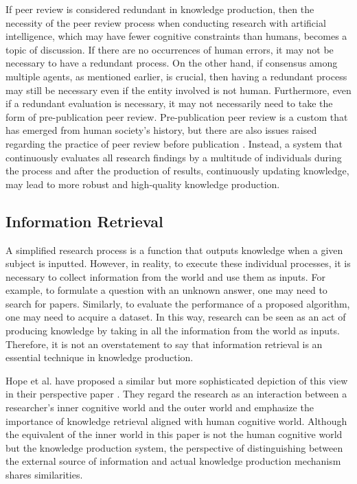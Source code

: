 \documentclass{book}
\begin{document}
If peer review is considered redundant in knowledge production, then the necessity of the peer review process when conducting research with artificial intelligence, which may have fewer cognitive constraints than humans, becomes a topic of discussion. If there are no occurrences of human errors, it may not be necessary to have a redundant process. On the other hand, if consensus among multiple agents, as mentioned earlier, is crucial, then having a redundant process may still be necessary even if the entity involved is not human. Furthermore, even if a redundant evaluation is necessary, it may not necessarily need to take the form of pre-publication peer review. Pre-publication peer review is a custom that has emerged from human society's history, but there are also issues raised regarding the practice of peer review before publication \cite{heesen2021peer}. Instead, a system that continuously evaluates all research findings by a multitude of individuals during the process and after the production of results, continuously updating knowledge, may lead to more robust and high-quality knowledge production.


\subsection{Information Retrieval}
A simplified research process is a function that outputs knowledge when a given subject is inputted. However, in reality, to execute these individual processes, it is necessary to collect information from the world and use them as inputs. For example, to formulate a question with an unknown answer, one may need to search for papers. Similarly, to evaluate the performance of a proposed algorithm, one may need to acquire a dataset. In this way, research can be seen as an act of producing knowledge by taking in all the information from the world as inputs. Therefore, it is not an overstatement to say that information retrieval is an essential technique in knowledge production. 

Hope et al. have proposed a similar but more sophisticated depiction of this view in their perspective paper \cite{hope2022computational}. They regard the research as an interaction between a researcher’s inner cognitive world and the outer world and emphasize the importance of knowledge retrieval aligned with human cognitive world. Although the equivalent of the inner world in this paper is not the human cognitive world but the knowledge production system, the perspective of distinguishing between the external source of information and actual knowledge production mechanism shares similarities.
\end{document}
